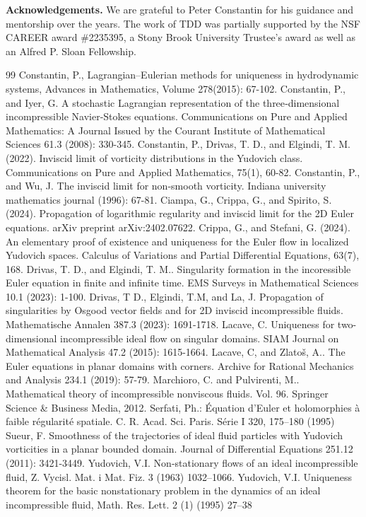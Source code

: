 \documentclass[12pt]{article}
\begin{document}
\vspace{2mm}

\noindent \textbf{Acknowledgements.}  We are grateful to Peter Constantin for his guidance and mentorship over the years.  The work of TDD was partially supported by the NSF CAREER award \#2235395, a Stony Brook University Trustee’s award as well as an Alfred P. Sloan Fellowship.





\begin{thebibliography}{99}
 Constantin, P., Lagrangian–Eulerian methods for uniqueness in hydrodynamic systems,
Advances in Mathematics, Volume 278(2015): 67-102.
Constantin, P., and Iyer, G. A stochastic Lagrangian representation of the three‐dimensional incompressible Navier‐Stokes equations. Communications on Pure and Applied Mathematics: A Journal Issued by the Courant Institute of Mathematical Sciences 61.3 (2008): 330-345.
Constantin, P., Drivas, T. D., and Elgindi, T. M. (2022). Inviscid limit of vorticity distributions in the Yudovich class. Communications on Pure and Applied Mathematics, 75(1), 60-82.
Constantin, P., and Wu, J. The inviscid limit for non-smooth vorticity. Indiana university mathematics journal (1996): 67-81.
Ciampa, G., Crippa, G., and Spirito, S. (2024). Propagation of logarithmic regularity and inviscid limit for the 2D Euler equations. arXiv preprint arXiv:2402.07622.
Crippa, G., and Stefani, G. (2024). An elementary proof of existence and uniqueness for the Euler flow in localized Yudovich spaces. Calculus of Variations and Partial Differential Equations, 63(7), 168.
Drivas, T. D., and Elgindi, T. M.. Singularity formation in the incoressible Euler equation in finite and infinite time. EMS Surveys in Mathematical Sciences 10.1 (2023): 1-100.
Drivas, T D., Elgindi, T.M, and La, J. Propagation of singularities by Osgood vector fields and for 2D inviscid incompressible fluids. Mathematische Annalen 387.3 (2023): 1691-1718.
Lacave, C. Uniqueness for two-dimensional incompressible ideal flow on singular domains. SIAM Journal on Mathematical Analysis 47.2 (2015): 1615-1664.
Lacave, C, and  Zlatoš, A.. The Euler equations in planar domains with corners. Archive for Rational Mechanics and Analysis 234.1 (2019): 57-79.
Marchioro, C. and Pulvirenti, M.. Mathematical theory of incompressible nonviscous fluids. Vol. 96. Springer Science \& Business Media, 2012.
Serfati, Ph.: \'{E}quation d’Euler et holomorphies à faible régularité spatiale. C. R. Acad. Sci. Paris. Série
I 320, 175–180 (1995)
 Sueur, F. Smoothness of the trajectories of ideal fluid particles with Yudovich vorticities in a planar bounded domain. Journal of Differential Equations 251.12 (2011): 3421-3449.
Yudovich,  V.I. Non-stationary flows of an ideal incompressible fluid, Z. Vycisl. Mat. i Mat. Fiz. 3 (1963) 1032–1066. 
Yudovich, V.I.  Uniqueness theorem for the basic nonstationary problem in the dynamics of an ideal incompressible fluid,
Math. Res. Lett. 2 (1) (1995) 27–38


\end{thebibliography}
\end{document}
